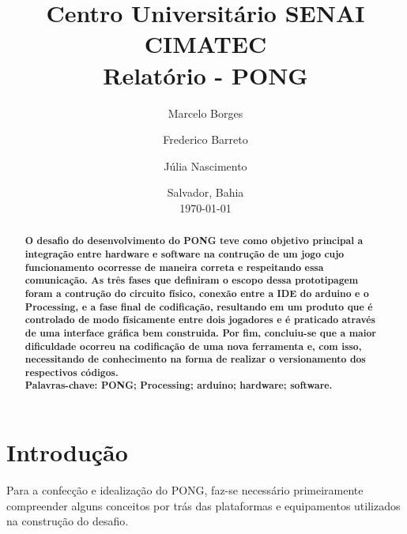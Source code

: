 \documentclass[11pt, a4paper, twocolumn]{article}
\begin{document}
\title{Centro Universitário SENAI CIMATEC\\
    \vspace{1cm}
    \textbf{Relatório - PONG \\}
}
\author[1]{Marcelo Borges}
\author[2]{Frederico Barreto}
\author[3]{Júlia Nascimento}
\date{Salvador, Bahia\\\today}
\maketitle
\begin{abstract} 
    \textbf{O desafio do desenvolvimento do PONG teve como objetivo principal a integração entre hardware e software 
    na contrução de um jogo cujo funcionamento ocorresse de maneira correta e respeitando essa comunicação. As três fases que 
    definiram o escopo dessa prototipagem foram a contrução do circuito físico, conexão entre a IDE do arduino e o Processing, e a 
    fase final de codificação, resultando em um produto que é controlado de modo físicamente entre dois jogadores e é praticado 
    através de uma interface gráfica bem construida. Por fim, concluiu-se que a maior dificuldade ocorreu na codificação de uma nova
    ferramenta e, com isso, necessitando de conhecimento na forma de realizar o versionamento dos respectivos códigos. 
    \\
    Palavras-chave: PONG; Processing; arduino; hardware; software.}
\end{abstract}
\section{Introdução}
    Para a confecção e idealização do PONG, faz-se necessário primeiramente compreender alguns conceitos por 
    trás das plataformas e equipamentos utilizados na construção do desafio.
    
\end{document}
